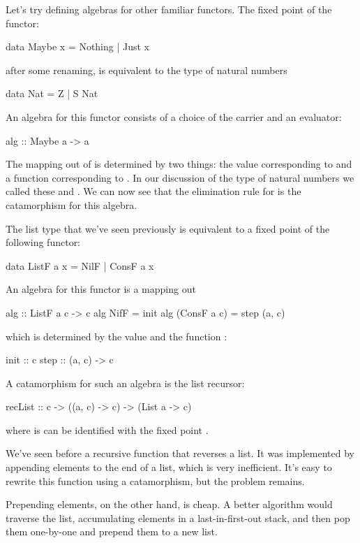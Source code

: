 \documentclass[DaoFP]{subfiles}
\begin{document}
Let's try defining algebras for other familiar functors. The fixed point of the  functor:
\begin{haskell}
data Maybe x = Nothing | Just x
\end{haskell}
after some renaming, is equivalent to the type of natural numbers
\begin{haskell}
data Nat = Z | S Nat
\end{haskell}
An algebra for this functor consists of a choice of the carrier  and an evaluator:
\begin{haskell}
alg :: Maybe a -> a
\end{haskell}
The mapping out of  is determined by two things: the value corresponding to  and a function  corresponding to . In our discussion of the type of natural numbers we called these  and . We can now see that the elimination rule for  is the catamorphism for this algebra.

The list type that we've seen previously is equivalent to a fixed point of the following functor:
\begin{haskell}
data ListF a x = NilF | ConsF a x
\end{haskell}
An algebra for this functor is a mapping out 
\begin{haskell}
alg :: ListF a c -> c
alg NifF = init
alg (ConsF a c) = step (a, c)
\end{haskell}
which is determined by the value  and the function :
\begin{haskell}
init :: c
step :: (a, c) -> c
\end{haskell}
A catamorphism for such an algebra is the list recursor:
\begin{haskell}
recList :: c -> ((a, c) -> c) -> (List a -> c)
\end{haskell}
where  is can be identified with the fixed point .

We've seen before a recursive function that reverses a list. It was implemented by appending elements to the end of a list, which is very inefficient. It's easy to rewrite this function using a catamorphism, but the problem remains. 

Prepending elements, on the other hand, is cheap. A better algorithm would traverse the list, accumulating elements in a last-in-first-out stack, and then pop them one-by-one and prepend them to a new list. 
\end{document}
